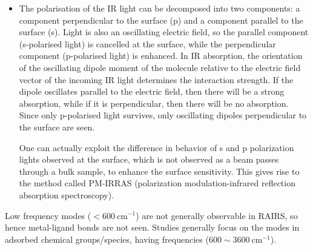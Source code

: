 \documentclass{article}
\theoremstyle{plain}\theoremheaderfont{\normalfont\itshape}\theorembodyfont{\rmfamily}\theoremseparator{.}\newtheorem*{rem}{Remark}\newtheorem*{ex}{Example}\newtheorem*{proof}{Proof}\newtheorem*{altp}{Alternative proof}
\theoremstyle{plain}\theoremheaderfont{\normalfont\bfseries}\theorembodyfont{\rmfamily}\theoremseparator{.}\newtheorem{thm}{Theorem}[section]\newtheorem{lem}[thm]{Lemma}\newtheorem{prop}[thm]{Proposition}\newtheorem*{cor}{Corollary}\newtheorem{defn}[thm]{Definition}\newtheorem{clm}[thm]{Claim}\newtheorem{clminproof}{Claim}\newtheorem*{law}{Law}\newtheorem{pos}[thm]{Postulate}
\theoremstyle{break}\theoremheaderfont{\normalfont\itshape}\theorembodyfont{\rmfamily}\theoremseparator{.\medskip}\newtheorem*{proofskip}{Proof}\newtheorem*{exs}{Examples}\newtheorem*{rems}{Remarks}
\theoremstyle{break}\theoremheaderfont{\normalfont\bfseries}\theorembodyfont{\rmfamily}\theoremseparator{.\medskip}\newtheorem{lemskip}[thm]{Lemma}\newtheorem{defnskip}[thm]{Definition}\newtheorem{propskip}[thm]{Proposition}\newtheorem{thmskip}[thm]{Theorem}
\numberwithin{equation}{section}
\newcommand{\unit}[1]{\ \mathrm{#1}}
\begin{document}
\begin{itemize}[topsep=0pt]
		\item The polarisation of the IR light can be decomposed into two components: a component perpendicular to the surface (p) and a component parallel to the surface (s). Light is also an oscillating electric field, so the parallel component (s-polarised light) is cancelled at the surface, while the perpendicular component (p-polarised light) is enhanced. In IR absorption, the orientation of the oscillating dipole moment of the molecule relative to the electric field vector of the incoming IR light determines the interaction strength. If the dipole oscillates parallel to the electric field, then there will be a strong absorption, while if it is perpendicular, then there will be no absorption. Since only p-polarised light survives, only oscillating dipoles perpendicular to the surface are seen.
		
		One can actually exploit the difference in behavior of s and p polarization lights observed at the surface, which is not observed as a beam passes through a bulk sample, to enhance the surface sensitivity. This gives rise to the method called PM-IRRAS (polarization modulation-infrared reflection absorption spectroscopy).
	\end{itemize}

	Low frequency modes (\(<600\unit{cm}^{-1}\)) are not generally observable in RAIRS, so hence metal-ligand bonds are not seen. Studies generally focus on the modes in adsorbed chemical groups/species, having frequencies (\(600\sim 3600\unit{cm}^{-1}\)).
\end{document}
